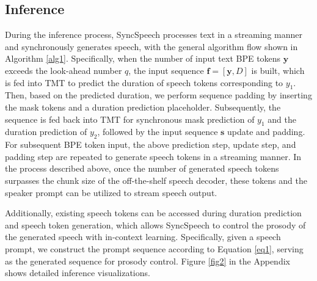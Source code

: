 \subsection{Inference}
\label{sec:inference}
During the inference process, SyncSpeech processes text in a streaming manner and synchronously generates speech, with the general algorithm flow shown in Algorithm \ref{alg1}. Specifically, when the number of input text BPE tokens $\boldsymbol{y}$ exceeds the look-ahead number $q$,  the input sequence $\boldsymbol{f} = [\boldsymbol{y}, D]$ is built, which is fed into TMT to predict the duration of speech tokens corresponding to $y_1$. Then, based on the predicted duration, we perform sequence padding by inserting the mask tokens and a duration prediction placeholder. Subsequently, the sequence is fed back into TMT for synchronous mask prediction of $y_1$ and the duration prediction of $y_2$, followed by the input sequence $\boldsymbol{s}$ update and padding. For subsequent BPE token input, the above prediction step, update step, and padding step are repeated to generate speech tokens in a streaming manner.
In the process described above, once the number of generated speech tokens surpasses the chunk size of the off-the-shelf speech decoder, these tokens and the speaker prompt can be utilized to stream speech output.

Additionally, existing speech tokens can be accessed during duration prediction and speech token generation, which allows SyncSpeech to control the prosody of the generated speech with in-context learning. Specifically, given a speech prompt, we construct the prompt sequence according to Equation \ref{eq1}, serving as the generated sequence for prosody control. Figure \ref{fig2} in the Appendix shows detailed inference visualizations.